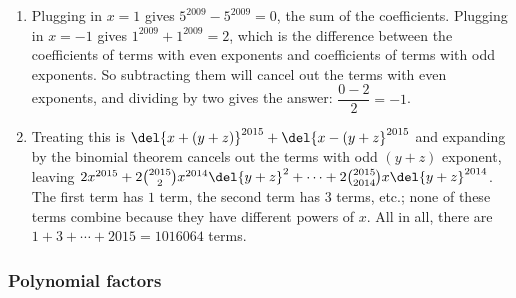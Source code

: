 \documentclass[10pt,paper=letter]{scrartcl}
\begin{document}
\begin{enumerate}
\item Plugging in $x = 1$ gives $5^{2009} - 5^{2009} = 0$, the sum of the coefficients. Plugging in $x = -1$ gives $1^{2009} + 1^{2009} = 2$, which is the difference between the coefficients of terms with even exponents and coefficients of terms with odd exponents. So subtracting them will cancel out the terms with even exponents, and dividing by two gives the answer: $\dfrac{0 - 2}2 = -1$.

\item Treating this is $\del{x + (y + z)}^{2015} + \del{x - (y + z}^{2015}$ and expanding by the binomial theorem cancels out the terms with odd $(y + z)$ exponent, leaving $2x^{2015} + 2\binom{2015}2x^{2014}\del{y+z}^2 + \cdots + 2\binom{2015}{2014}x\del{y+z}^{2014}$. The first term has $1$ term, the second term has $3$ terms, etc.; none of these terms combine because they have different powers of $x$. All in all, there are $1 + 3 + \cdots + 2015 = 1016064$ terms.

\end{enumerate}

\subsubsection*{Polynomial factors}
\end{document}
